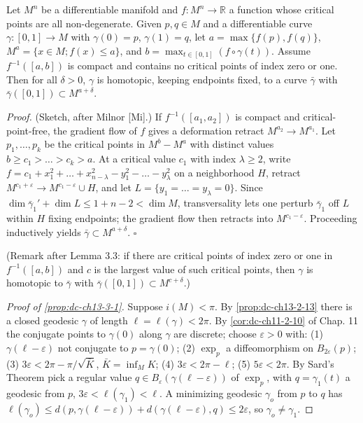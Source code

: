 \begin{lemma}
  \label{lem:dc-ch13-3-3}
  Let $M^n$ be a differentiable manifold and $f:M^n\to\mathbb{R}$ a function whose
  critical points are all non-degenerate. Given $p,q\in M$ and a differentiable curve
  $\gamma:[0,1]\to M$ with $\gamma(0)=p$, $\gamma(1)=q$, let $a=\max\{f(p),f(q)\}$,
  $M^a=\{x\in M;f(x)\leq a\}$, and $b=\max_{t\in[0,1]}(f\circ\gamma(t))$. Assume
  $f^{-1}([a,b])$ is compact and contains no critical points of index zero or one.
  Then for all $\delta>0$, $\gamma$ is homotopic, keeping endpoints fixed, to a curve
  $\bar\gamma$ with $\bar\gamma([0,1])\subset M^{a+\delta}$.
\end{lemma}
\begin{proof}
  (Sketch, after Milnor [Mi].) If $f^{-1}([a_1,a_2])$ is compact and
  critical-point-free, the gradient flow of $f$ gives a deformation retract
  $M^{a_2}\to M^{a_1}$. Let $p_1,\dots,p_k$ be the critical points in $M^b-M^a$ with
  distinct values $b\geq c_1>\dots>c_k>a$. At a critical value $c_1$ with index
  $\lambda\geq 2$, write $f=c_1+x_1^2+\dots+x_{n-\lambda}^2-y_1^2-\dots-y_\lambda^2$ on
  a neighborhood $H$, retract $M^{c_1+\varepsilon}\to M^{c_1-\varepsilon}\cup H$, and
  let $L=\{y_1=\dots=y_\lambda=0\}$. Since
  $\dim\bar\gamma_1'+\dim L\leq 1+n-2<\dim M$, transversality lets one perturb
  $\bar\gamma_1$ off $L$ within $H$ fixing endpoints; the gradient flow then retracts
  into $M^{c_1-\varepsilon}$. Proceeding inductively yields
  $\bar\gamma\subset M^{a+\delta}$. $\square$
  
  (Remark after Lemma 3.3: if there are critical points of index zero or one in
  $f^{-1}([a,b])$ and $c$ is the largest value of such critical points, then
  $\gamma$ is homotopic to $\bar\gamma$ with
  $\bar\gamma([0,1])\subset M^{c+\delta}$.)
  
  \emph{Proof of \cref{prop:dc-ch13-3-1}.} Suppose $i(M)<\pi$. By \cref{prop:dc-ch13-2-13} there is a
  closed geodesic $\gamma$ of length $\ell=\ell(\gamma)<2\pi$. By \cref{cor:dc-ch11-2-10} of
  Chap. 11 the conjugate points to $\gamma(0)$ along $\gamma$ are discrete; choose
  $\varepsilon>0$ with: (1) $\gamma(\ell-\varepsilon)$ not conjugate to $p=\gamma(0)$;
  (2) $\exp_p$ a diffeomorphism on $B_{2\varepsilon}(p)$;
  (3) $3\varepsilon<2\pi-\pi/\sqrt{\bar K}$, $\bar K=\inf_M K$;
  (4) $3\varepsilon<2\pi-\ell$; (5) $5\varepsilon<2\pi$. By Sard's Theorem pick a
  regular value $q\in B_\varepsilon(\gamma(\ell-\varepsilon))$ of $\exp_p$, with
  $q=\gamma_1(t)$ a geodesic from $p$, $3\varepsilon<\ell(\gamma_1)<\ell$. A
  minimizing geodesic $\gamma_o$ from $p$ to $q$ has
  $\ell(\gamma_o)\leq d(p,\gamma(\ell-\varepsilon))+d(\gamma(\ell-\varepsilon),q)\leq 2\varepsilon$,
  so $\gamma_o\neq\gamma_1$.
  

\end{proof}
